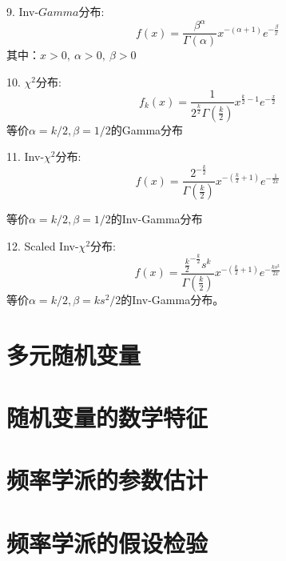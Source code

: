 9. Inv-$Gamma$分布: 
\begin{equation}
    f(x)=\frac{\beta^{\alpha}}{\Gamma(\alpha)} x^{-(\alpha+1)} e^{-\frac{\beta}{x}}
\end{equation}
   其中：$x>0,\ \alpha>0,\ \beta>0$

10. $\chi ^2$分布: 
\begin{equation}
    f_{k}(x)=\frac{1}{2^{\frac{k}{2}} \Gamma\left(\frac{k}{2}\right)} x^{\frac{k}{2}-1} e^{-\frac{x}{2}}
\end{equation}
    等价$\alpha=k/2,\beta = 1/2$的Gamma分布

11. Inv-$\chi ^2$分布: 
\begin{equation}
    f(x)=\frac{2^{-\frac{k}{2}}}{\Gamma\left(\frac{k}{2}\right)} x^{-\left(\frac{k}{2}+1\right)} e^{-\frac{1}{2 x}}
\end{equation}
    
    等价$\alpha=k/2,\beta = 1/2$的Inv-Gamma分布

12. Scaled Inv-$\chi ^2$分布: 
   \begin{equation}
       f(x)=\frac{\frac{k}{2}^{-\frac{k}{2}} s^{k}}{\Gamma\left(\frac{k}{2}\right)} x^{-\left(\frac{k}{2}+1\right)} e^{-\frac{k s^{2}}{2 x}}
   \end{equation}
     等价$\alpha=k/2,\beta = ks^2/2$的Inv-Gamma分布。


\section{多元随机变量}

\section{随机变量的数学特征}

\section{频率学派的参数估计}

\section{频率学派的假设检验}